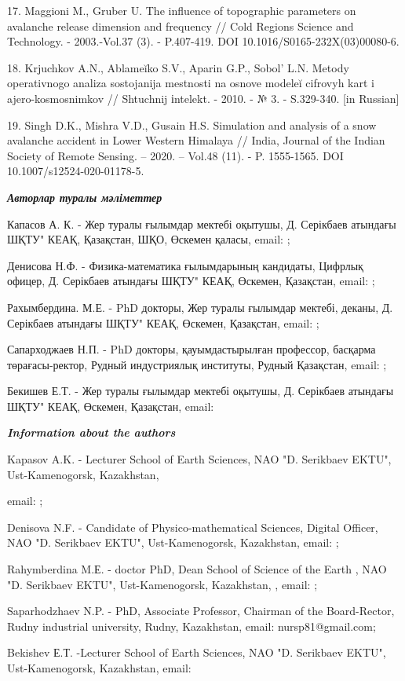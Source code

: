 \begin{references}
17. Maggioni M., Gruber U. The influence of topographic parameters on
avalanche release dimension and frequency // Cold Regions Science and
Technology. - 2003.-Vol.37 (3). - P.407-419. DOI
10.1016/S0165-232X(03)00080-6.

18. Krjuchkov A.N., Ablameĭko S.V., Aparin G.P., Sobol'{}
L.N. Metody operativnogo analiza sostojanija mestnosti na osnove modeleĭ
cifrovyh kart i ajero-kosmosnimkov // Shtuchnij іntelekt. - 2010. - № 3.
- S.329-340. {[}in Russian{]}

19. Singh D.K., Mishra V.D., Gusain H.S. Simulation and analysis of a
snow avalanche accident in Lower Western Himalaya // India, Journal of
the Indian Society of Remote Sensing. -- 2020. -- Vol.48 (11). - P.
1555-1565. DOI 10.1007/s12524-020-01178-5.
\end{references}

\begin{authorinfo}
\emph{{\bfseries Авторлар туралы мәліметтер}}

Капасов А. К. - Жер туралы ғылымдар мектебі оқытушы, Д. Серікбаев
атындағы ШҚТУ" КЕАҚ, Қазақстан, ШҚО, Өскемен қаласы, email:
\href{mailto:AKapasov@edu.ektu.kz}{};

Денисова Н.Ф. - Физика-математика ғылымдарының кандидаты, Цифрлық
офицер, Д. Серікбаев атындағы ШҚТУ" КЕАҚ, Өскемен, Қазақстан, email:
\href{mailto:NDenisova@ektu.kz}{};

Рахымбердина. М.Е. - PhD докторы, Жер туралы ғылымдар мектебі, деканы,
Д. Серікбаев атындағы ШҚТУ" КЕАҚ, Өскемен, Қазақстан, email:
\href{mailto:MRahymberdina@edu.ektu.kz}{};

Сапарходжаев Н.П. - PhD докторы, қауымдастырылған профессор, басқарма
төрағасы-ректор, Рудный индустриялық институты, Рудный Қазақстан, email:
\href{mailto:nursp81@gmail.com}{};

Бекишев Е.Т. - Жер туралы ғылымдар мектебі оқытушы, Д. Серікбаев
атындағы ШҚТУ" КЕАҚ, Өскемен, Қазақстан, email:
\href{mailto:YBekishev@edu.ektu.kz}{}

\emph{{\bfseries Information about the authors}}

Kapasov A.K. - Lecturer School of Earth Sciences, NAO "D. Serikbaev
EKTU", Ust-Kamenogorsk, Kazakhstan,

email: \href{mailto:AKapasov@edu.ektu.kz}{};

Denisova N.F. - Candidate of Physico-mathematical Sciences, Digital
Officer, NAO "D. Serikbaev EKTU", Ust-Kamenogorsk, Kazakhstan, email:
\href{mailto:NDenisova@ektu.kz}{};

Rahymberdina M.Е. - doctor PhD, Dean School of Science of the Earth ,
NAO "D. Serikbaev EKTU", Ust-Kamenogorsk, Kazakhstan, , email:
\href{mailto:MRahymberdina@edu.ektu.kz}{};

Saparhodzhaev N.P. - PhD, Associate Professor, Chairman of the
Board-Rector, Rudny industrial university, Rudny, Kazakhstan, email:
nursp81@gmail.com;

Bekishev Е.Т. -Lecturer School of Earth Sciences, NAO "D. Serikbaev
EKTU", Ust-Kamenogorsk, Kazakhstan, email:
\end{authorinfo}
